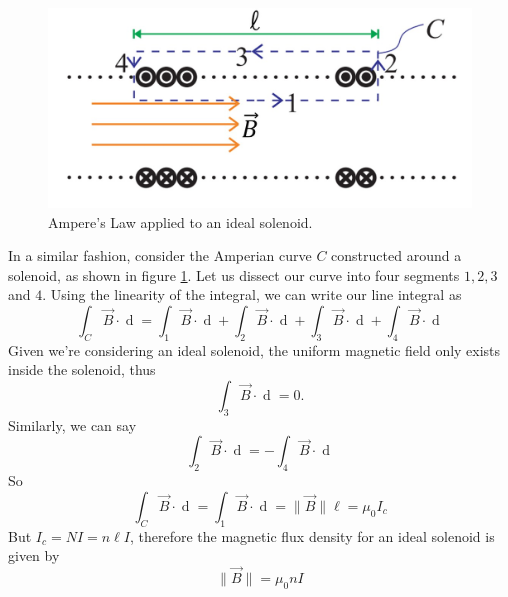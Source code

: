 \begin{figure}[h!]
    \centering
    \includegraphics[scale=0.5]{notes/images/Amperes-Law-Solenoid.JPG}
    \caption{Ampere's Law applied to an ideal solenoid.}
    \label{fig:amperes-law-solenoid}
\end{figure}
\FloatBarrier

In a similar fashion, consider the Amperian curve $C$ constructed around a solenoid, as shown in figure \ref{fig:amperes-law-solenoid}. Let us dissect our curve into four segments $1,2,3$ and $4$. Using the linearity of the integral, we can write our line integral as
\begin{equation}
    \int_C \vec{B} \cdot \mathop{\mathrm{d}\vec{s}} = \int_1 \vec{B} \cdot \mathop{\mathrm{d}\vec{s}} + \int_2 \vec{B} \cdot \mathop{\mathrm{d}\vec{s}} + \int_3 \vec{B} \cdot \mathop{\mathrm{d}\vec{s}} + \int_4 \vec{B} \cdot \mathop{\mathrm{d}\vec{s}}
\end{equation}
Given we're considering an ideal solenoid, the uniform magnetic field only exists inside the solenoid, thus
\begin{equation}
    \int_3 \vec{B} \cdot \mathop{\mathrm{d}\vec{s}} = 0.
\end{equation}
Similarly, we can say
\begin{equation}
    \int_2 \vec{B} \cdot \mathop{\mathrm{d}\vec{s}} = - \int_4 \vec{B} \cdot \mathop{\mathrm{d}\vec{s}}
\end{equation}
So
\begin{equation}
    \int_C \vec{B} \cdot \mathop{\mathrm{d}\vec{s}} = \int_1 \vec{B} \cdot \mathop{\mathrm{d}\vec{s}} = \| \vec{B} \| \ell = \mu_0 I_c
\end{equation}
But $I_c = NI = n\ell I$, therefore the magnetic flux density for an ideal solenoid is given by
\begin{equation}
    \| \vec{B} \| = \mu_0 n I
\end{equation}

